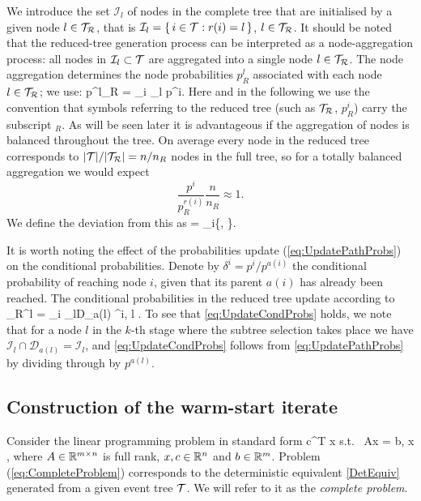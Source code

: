 We introduce the set $\mathcal{I}_l$ of nodes in the complete tree 
that are initialised by a given node $l\in\mathcal{T}_\mathcal{R}$, that is
$\mathcal{I}_l = \{\, i \in \mathcal{T} : r(i) = l \,\}$, $l \in \mathcal{T}_\mathcal{R}$.
It should be noted that the reduced-tree generation process can be
interpreted as a node-aggregation process: all nodes in
$\mathcal{I}_l\subset\mathcal{T}$ are aggregated into a single node $l\in\mathcal{T}_\mathcal{R}$.
The node aggregation determines the node probabilities $p_R^l$ associated
with each node $l\in\mathcal{T}_\mathcal{R}$; we use:
\be  \label{eq:UpdatePathProbs}
  p^l_R = \sum_{i \in {}_l} p^i.
\ee
Here and in the following we use the convention that symbols referring
to the reduced tree (such as $\mathcal{T}_\mathcal{R}$, $p_R^i$) carry the subscript $_R$.
As will be seen later it is advantageous if the aggregation of nodes
is balanced throughout the tree. On average every node in the reduced
tree corresponds to $|\mathcal{T}|/|\mathcal{T}_\mathcal{R}|=n/n_R$ nodes in the full tree, so for
a totally balanced aggregation we would expect 
\[
  \frac{p^i}{p_R^{r(i)}}\frac{n}{n_R}\approx 1.
\]
We define the deviation from this as
\be  \label{eq:rho}
  \rho = \max_{i\in\Rtree}\left\{, 
                                 \right\}.
\ee

It is worth noting the effect of the probabilities update
(\ref{eq:UpdatePathProbs}) on the conditional probabilities.
Denote by $\delta^i = p^i/p^{a(i)}$ the conditional probability of
reaching node $i$, given that its parent $a(i)$ has already been
reached.
The conditional probabilities in the reduced tree update according to
\be  \label{eq:UpdateCondProbs}
  \delta_R^l = \!\!\! \sum_{i \in {}_l\cap D_{a(l)}} \!\!\! \delta^i,
  \quad l \in \Rtree.
\ee
To see that \eqref{eq:UpdateCondProbs} holds, we note that for a node $l$
in the $k$-th stage where the subtree selection takes place we have
$\mathcal{I}_l \cap \mathcal{D}_{a(l)} = \mathcal{I}_l$, and
\eqref{eq:UpdateCondProbs} follows from \eqref{eq:UpdatePathProbs}
by dividing through by $p^{a(l)}$.

%
%
\subsection{Construction of the warm-start iterate}
\label{sec:Construction}

Consider the linear programming problem in standard form
\be  \label{eq:CompleteProblem}
\min\;  c^T x \;\quad \mbox{s.t. }\; Ax = b, \;\; x ,
\ee
where $A \in \mathbb{R}^{m \times n}$ is full rank, 
$x, c \in \mathbb{R}^{n}$ and $b \in \mathbb{R}^{m}$. 
Problem (\ref{eq:CompleteProblem})
corresponds to the deterministic equivalent \eqref{DetEquiv} generated from a
given event tree $\mathcal{T}$. We will refer to it as the 
{\em complete problem}.


